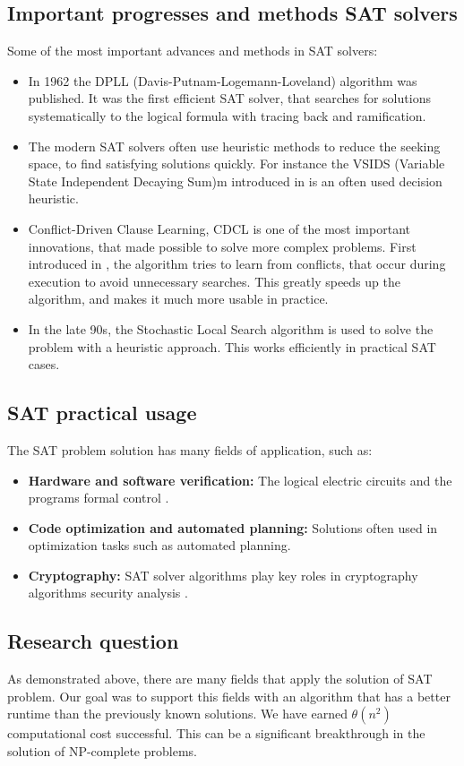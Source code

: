 \documentclass{article}
\begin{document}
\subsection{Important progresses and methods SAT solvers}
Some of the most important advances and methods in SAT solvers:
\begin{itemize}
    \item In 1962 the DPLL (Davis-Putnam-Logemann-Loveland) algorithm was published. It was the first efficient SAT solver, that searches for solutions systematically to the logical formula with tracing back and ramification.
    \item The modern SAT solvers often use heuristic methods to reduce the seeking space, to find satisfying solutions quickly. For instance the VSIDS (Variable State Independent Decaying Sum)m introduced in \cite{VSIDS} is an often used decision heuristic.
    \item Conflict-Driven Clause Learning, CDCL is one of the most important innovations, that made possible to solve more complex problems. First introduced in \cite{CDCL}, the algorithm tries to learn from conflicts, that occur during execution to avoid unnecessary searches. This greatly speeds up the algorithm, and makes it much more usable in practice.
    \item In the late 90s, the Stochastic Local Search algorithm is used to solve the problem with a heuristic approach. This works efficiently in practical SAT cases.
\end{itemize}

\subsection{SAT practical usage}
The SAT problem solution has many fields of application, such as:
\begin{itemize}
    \item \textbf{Hardware and software verification:} The logical electric circuits and the programs formal control \cite{c32SAT}.
    \item \textbf{Code optimization and automated planning:} Solutions often used in optimization tasks such as automated planning.
    \item \textbf{Cryptography:} SAT solver algorithms play key roles in cryptography algorithms security analysis \cite{SATInCrypto}.
\end{itemize}

\subsection{Research question}
As demonstrated above, there are many fields that apply the solution of SAT problem. Our goal was to support this fields with an algorithm that has a better runtime than the previously known solutions. We have earned $\theta(n^2)$ computational cost successful. This can be a significant breakthrough in the solution of NP-complete problems.
\end{document}
